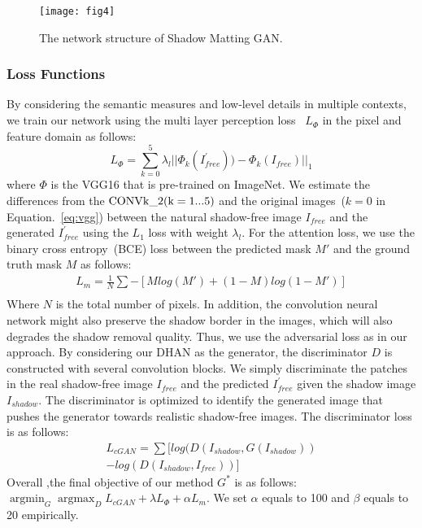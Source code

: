 \documentclass[letterpaper]{article} \usepackage{aaai20}  \usepackage{times}  \usepackage{helvet} \usepackage{courier}  \usepackage[hyphens]{url}  \urlstyle{rm} \def\UrlFont{\rm}  \usepackage{graphicx}  \frenchspacing  \setlength{\pdfpagewidth}{8.5in}  \setlength{\pdfpageheight}{11in}  \usepackage{amssymb}
\begin{document}
\begin{figure*}[h]
	\centering
  \texttt{[image: fig4]}
  \caption{The network structure of Shadow Matting GAN.}
  \label{fig:shadowbank}
\end{figure*}

\subsubsection{Loss Functions}
By considering the semantic measures and low-level details in multiple contexts, we train our network using the multi layer perception loss~\cite{2018arXiv180605376Z,johnson2016perceptual} $L_{\Phi}$ in the pixel and feature domain as follows: 
\begin{equation}
  L_{\Phi} = \sum^{5}_{k=0}\lambda_{l}||\Phi_{k}( I_{free}^{'})) - \Phi_{k}(I_{free}) ||_1
 \label{eq:vgg} 
\end{equation}
where ${\Phi}$ is the VGG16 that is pre-trained on ImageNet. We estimate the differences from the $\rm{CONV} k\_2 (k = 1...5) $ and the original images~($k=0$ in Equation.~\ref{eq:vgg}) between the natural shadow-free image $I_{free}$ and the generated $I_{free}^{'}$ using the $L_1$ loss with weight $\lambda_{l}$. For the attention loss, we use the binary cross entropy~(BCE) loss between the predicted mask $M'$ and the ground truth mask $M$ as follows:
\begin{equation}
\begin{aligned}
L_{m} = \frac{1}{N}\sum- [Mlog(M') + (1- M)log(1-M')]  \\
 \end{aligned}
\end{equation}
Where $N$ is the total number of pixels.
In addition, the convolution neural network might also preserve the shadow border in the images, which will also degrades the shadow removal quality. Thus, we use the adversarial loss as \cite{isola2017image} in our approach. By considering our DHAN as the generator, the discriminator $D$ is constructed with several convolution blocks. We simply discriminate the patches in the real shadow-free image $I_{free}$ and the predicted $I_{free}^{'}$ given the shadow image $I_{shadow}$. The discriminator is optimized to identify the generated image that pushes the generator towards realistic shadow-free images. The discriminator loss is as follows:
\begin{equation}
\begin{aligned}
L_{cGAN} = \sum [log(D(I_{shadow},G(I_{shadow})) \\
- log(D(I_{shadow},I_{free})) ]
\end{aligned}
\label{eq:gan} 
\end{equation}
Overall ,the final objective of our method $G^{*}$ is as follows:
$\mathop{\arg\min}_{G}\mathop{\arg\max}_{D}L_{cGAN} + \lambda L_{\Phi} + \alpha L_{m}$. We set $\alpha$ equals to 100 and $\beta$ equals to 20 empirically.
\end{document}
